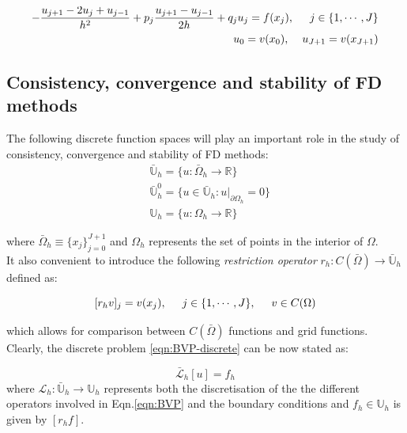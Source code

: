 \documentclass[11pt]{article}
\theoremstyle{theorem}
\theoremstyle{definition}
\begin{document}
\begin{align}\label{eqn:BVP-discrete}
\begin{split}
-\frac{u_{j+1}-2u_j+u_{j-1}}{h^2}+p_j\frac{u_{j+1}-u_{j-1}}{2h}+q_ju_j=f(x_j), \hspace{5mm}j\in\lbrace 1, \cdots, J\rbrace\\
u_0=v(x_0),\hspace{4mm} u_{J+1}=v(x_{J+1})
\end{split}
\end{align}
	
\subsection{Consistency, convergence and stability of FD methods}
The following discrete function spaces will play an important role in the study of consistency, convergence and stability of FD methods:
\begin{align*}
	&\bar{\mathbb{U}}_h=\lbrace u:\bar{\Omega}_h\rightarrow\mathbb{R}\rbrace\\
	&\bar{\mathbb{U}}^0_h=\lbrace u\in\bar{\mathbb{U}}_h : u|_{\partial\Omega_h}=0\rbrace\\
	&{\mathbb{U}}_h=\lbrace u:\Omega_h\rightarrow\mathbb{R}\rbrace
\end{align*}

where $\bar{\Omega}_h\equiv\lbrace x_j\rbrace_{j=0}^{J+1}$ and $\Omega_h$ represents the set of points in the interior of $\Omega$.\\
It also convenient to introduce the following \emph{restriction operator} $r_h:C(\bar{\Omega})\rightarrow\bar{\mathbb{U}}_h$ defined as:

$$[r_h v]_j=v(x_j),\hspace{5mm}j\in\lbrace 1, \cdots, J\rbrace,\hspace{5mm} v\in C(\Omega)$$

which allows for comparison between $C(\bar{\Omega})$ functions and grid functions.\\

Clearly, the discrete problem \eqref{eqn:BVP-discrete} can be now stated as:

\begin{equation}
	\label{eqn:BVP-general-discr}
\end{equation}
$$\bar{\mathcal{L}}_h[u]=f_h$$
where $\mathcal{L}_h:\bar{\mathbb{U}}_h\rightarrow\mathbb{U}_h$ represents both the discretisation of the the different operators involved in Eqn.\eqref{eqn:BVP} and the boundary conditions and $f_h\in\mathbb{U}_h$ is given by $[r_hf]$.\\
\end{document}
